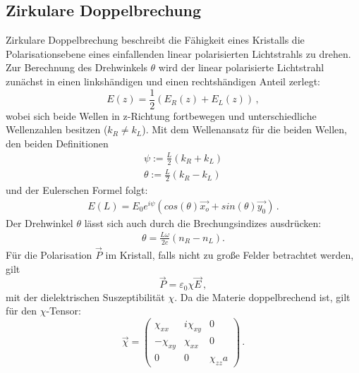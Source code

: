 \subsection{Zirkulare Doppelbrechung}
Zirkulare Doppelbrechung beschreibt die Fähigkeit eines Kristalls die Polarisationsebene eines einfallenden linear polarisierten Lichtstrahls zu drehen.
Zur Berechnung des Drehwinkels $\theta$ wird der linear polarisierte Lichtstrahl zunächst in einen linkshändigen und einen rechtshändigen Anteil zerlegt:
\begin{equation*}
	E(z)= \frac{1}{2}(E_R(z)+E_L(z)) \, \mathrm{,}
\end{equation*}
wobei sich beide Wellen in z-Richtung fortbewegen und unterschiedliche Wellenzahlen besitzen ($k_R \neq k_L$).
Mit dem Wellenansatz für die beiden Wellen, den beiden Definitionen
\begin{align}\label{Winkel}
	\psi := \frac{L}{2} (k_R + k_L) \\\nonumber
	\theta := \frac{L}{2} (k_R - k_L) 
\end{align}
und der Eulerschen Formel folgt:
\begin{align}
	E(L)=E_0 e^{i\psi}(cos(\theta ) \vec{x_o} + sin(\theta ) \vec{y_0} ) \, \mathrm{.}
\end{align}
Der Drehwinkel $\theta$ lässt sich auch durch die Brechungsindizes ausdrücken:
\begin{align*}
	\theta = \frac{L \omega}{2 c} (n_R - n_L) \mathrm{.}
\end{align*}
Für die Polarisation $\vec{P}$ im Kristall, falls nicht zu große Felder betrachtet werden, gilt
\begin{equation*}
	\vec{P}=\varepsilon_0 \chi \vec{E} \, \mathrm{,}
\end{equation*}
mit der dielektrischen Suszeptibilität $\chi$. Da die Materie doppelbrechend ist, gilt für den $\chi$-Tensor:
\begin{equation*}
	\vec{\chi} =
	\begin{pmatrix}
		\chi_{xx} & i\chi_{xy} & 0 \\
		-\chi_{xy} & \chi_{xx} & 0 \\
		0 & 0 & \chi_{zz}a
	\end{pmatrix} \, \mathrm{.}
\end{equation*}
